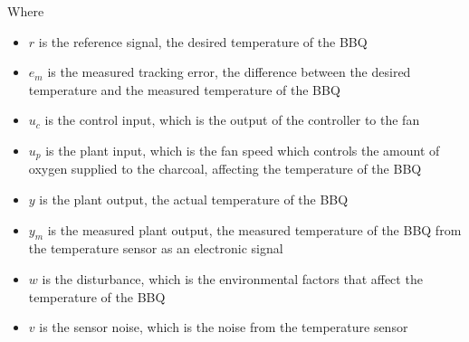 Where
\begin{itemize}
    \item $r$ is the reference signal, the desired temperature of the BBQ
    \item $e_m$ is the measured tracking error, the difference between the desired temperature and the measured temperature of the BBQ
    \item $u_c$ is the control input, which is the output of the controller to the fan 
    \item $u_p$ is the plant input, which is the fan speed which controls the amount of oxygen supplied to the charcoal, affecting the temperature of the BBQ
    \item $y$ is the plant output, the actual temperature of the BBQ
    \item $y_m$ is the measured plant output, the measured temperature of the BBQ from the temperature sensor as an electronic signal
    \item $w$ is the disturbance, which is the environmental factors that affect the temperature of the BBQ
    \item $v$ is the sensor noise, which is the noise from the temperature sensor
\end{itemize}
